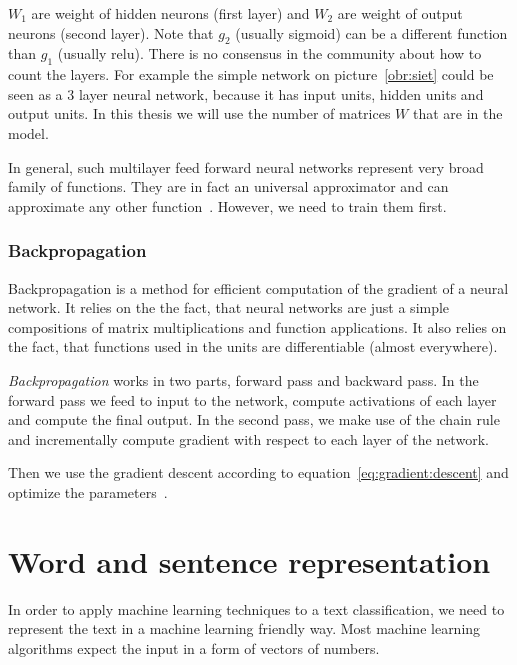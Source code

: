     $W_1$ are weight of hidden neurons (first layer) and $W_2$ are weight of output neurons (second layer). Note that $g_2$ (usually sigmoid) can be a different function than $g_1$ (usually relu).
    There is no consensus in the community about how to count the layers. 
    For example the simple network on picture~\ref{obr:siet} could be seen as a $3$ layer neural network,
    because it has input units, hidden units and output units.
    In this thesis we will use the number of matrices $W$ that are in the model.
    
    In general, such multilayer feed forward neural networks represent very broad family of functions.
    They are in fact an universal approximator and can approximate any other function~\cite{cybenko1989approximation}.
    However, we need to train them first.
    
    \subsubsection{Backpropagation} \label{sec:backprop}
    
    Backpropagation is a method for efficient computation of the gradient of a neural network.
    It relies on the the fact, that neural networks are just a simple compositions of matrix multiplications and function applications. 
    It also relies on the fact, that functions used in the units are differentiable (almost everywhere).
    
    \textit{Backpropagation} works in two parts, forward pass and backward pass.
    In the forward pass we feed to input to the network, compute activations of each layer and compute the final output.
    In the second pass, we make use of the chain rule and incrementally compute gradient with respect to each layer of the network.
    
    Then we use the gradient descent according to equation~\ref{eq:gradient:descent} and optimize the parameters~\cite{rumelhart1986david}.
    
    
    
\section{Word and sentence representation}

    In order to apply machine learning techniques to a text classification, 
    we need to represent the text in a machine learning friendly way.
    Most machine learning algorithms expect the input in a form of vectors of numbers. 
    
